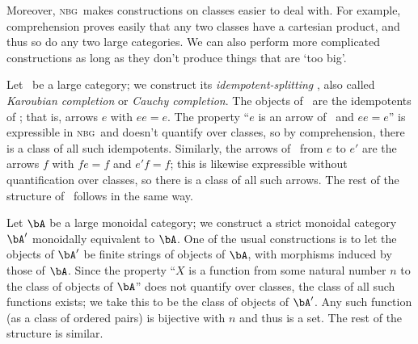 \documentclass[12pt]{amsart}
\def\nbg{\textsc{nbg}}
\begin{document}
Moreover, \nbg\ makes constructions on classes easier to deal with.
For example, comprehension proves easily that any two classes have a
cartesian product, and thus so do any two large categories.  We can
also perform more complicated constructions as long as they don't
produce things that are `too big'.

\begin{eg}
  Let \bA\ be a large category; we construct its
  \emph{idempotent-splitting} \bAbar, also called \emph{Karoubian
    completion} or \emph{Cauchy completion}.  The objects of \bAbar\
  are the idempotents of \bA; that is, arrows $e$ with $ee=e$.  The
  property ``$e$ is an arrow of \bA\ and $ee=e$'' is expressible in
  \nbg\ and doesn't quantify over classes, so by comprehension, there is
  a class of all such idempotents.  Similarly, the arrows of \bAbar\
  from $e$ to $e'$ are the arrows $f$ with $fe=f$ and $e'f=f$; this is
  likewise expressible without quantification over classes, so there
  is a class of all such arrows.  The rest of the structure of \bAbar\
  follows in the same way.
\end{eg}

\begin{eg}
  Let $\bA$ be a large monoidal category; we construct a strict
  monoidal category $\bA'$ monoidally equivalent to $\bA$.  One of the
  usual constructions is to let the objects of $\bA'$ be finite
  strings of objects of $\bA$, with morphisms induced by those of
  $\bA$.  Since the property ``$X$ is a function from some natural
  number $n$ to the class of objects of $\bA$'' does not quantify over
  classes, the class of all such functions exists; we take this to be
  the class of objects of $\bA'$.  Any such function (as a class of
  ordered pairs) is bijective with $n$ and thus is a set.  The rest of
  the structure is similar.
\end{eg}
\end{document}

